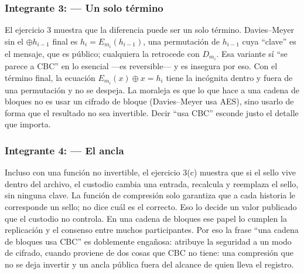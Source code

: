 \documentclass[11pt,letterpaper]{article}
\newcommand{\xor}{\oplus}
\begin{document}
\subsubsection*{Integrante 3: \underline{\hspace{4cm}} --- Un solo término}
El ejercicio 3 muestra que la diferencia puede ser un solo término. Davies--Meyer sin el $\xor h_{i-1}$ final es
$h_i = E_{m_i}(h_{i-1})$, una permutación de $h_{i-1}$ cuya ``clave'' es el mensaje, que es público; cualquiera la
retrocede con $D_{m_i}$. Esa variante sí ``se parece a CBC'' en lo esencial ---es reversible--- y es insegura por eso.
Con el término final, la ecuación $E_{m_i}(x)\xor x = h_i$ tiene la incógnita dentro y fuera de una permutación y no se
despeja. La moraleja es que lo que hace a una cadena de bloques no es usar un cifrado de bloque (Davies--Meyer usa AES),
sino usarlo de forma que el resultado no sea invertible. Decir ``usa CBC'' esconde justo el detalle que importa.

\subsubsection*{Integrante 4: \underline{\hspace{4cm}} --- El ancla}
Incluso con una función no invertible, el ejercicio 3(c) muestra que si el sello vive dentro del archivo, el custodio
cambia una entrada, recalcula y reemplaza el sello, sin ninguna clave. La función de compresión solo garantiza que a
cada historia le corresponde un sello; no dice cuál es el correcto. Eso lo decide un valor publicado que el custodio no
controla. En una cadena de bloques ese papel lo cumplen la replicación y el consenso entre muchos participantes. Por
eso la frase ``una cadena de bloques usa CBC'' es doblemente engañosa: atribuye la seguridad a un modo de cifrado,
cuando proviene de dos cosas que CBC no tiene: una compresión que no se deja invertir y un ancla pública fuera del
alcance de quien lleva el registro.
\end{document}
